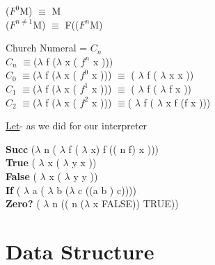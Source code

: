 \documentclass{article}
\begin{document}
\begin{flushleft}
($F^{0}$M)  $\equiv$ M\\
($F^{n\neq1}$M)  $\equiv$ F(($F^{n}$M)\\
\vspace{8mm}





\hspace{1cm} Church Numeral = $C_n$\\
\vspace{1mm}
\hspace{1cm}  $C_n$ $\equiv$($\lambda$ f ($\lambda$ x ( $f^{n}$ x )))\\
\hspace{1cm}  $C_0$ $\equiv$($\lambda$ f ($\lambda$ x ( $f^{0}$ x )))  $\equiv$ ( $\lambda$ f ( $\lambda$ x x )) \\
\hspace{1cm}  $C_1$ $\equiv$($\lambda$ f ($\lambda$ x ( $f^{1}$ x )))  $\equiv$ ( $\lambda$ f ( $\lambda$ f x )) \\
\hspace{1cm}  $C_2$ $\equiv$($\lambda$ f ($\lambda$ x ( $f^{2}$ x )))  $\equiv$( $\lambda$ f ( $\lambda$ x f (f x ))) \\
\vspace{5mm}

\hspace{1cm}\underline{Let}- as we did for our interpreter

\hspace{1cm}\textbf{Succ} ($\lambda$ n ( $\lambda$ f ( $\lambda$ x) f (( n f) x )))\\
\hspace{1cm}\textbf{True} ( $\lambda$ x ( $\lambda$ y x ))\\
\hspace{1cm}\textbf{False} ( $\lambda$ x ( $\lambda$ y y ))\\
\hspace{1cm}\textbf{If} ( $\lambda$ a ( $\lambda$ b ($\lambda$ c ((a b ) c))))\\
\hspace{1cm}\textbf{Zero?} ( $\lambda$ n (( n ($\lambda$ x FALSE)) TRUE))\\
\vspace{5mm}





\section{Data Structure}


\end{flushleft}
\end{document}
